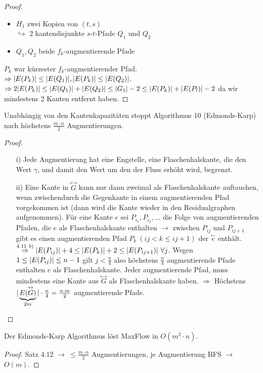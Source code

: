 \begin{proof}
	\begin{itemize}
		\item $H_1$ zwei Kopien von $(t,s)$\\
		$\hookrightarrow$ 2 kantendisjunkte $s$-$t$-Pfade $Q_1$ und $Q_2$
		\item $Q_1, Q_2$ beide $f_k$-augmentierende Pfade
	\end{itemize}
	$P_k$ war kürzester $f_k$-augmentierender Pfad.\\
	$\Rightarrow \vert E(P_k) \vert \le \vert E(Q_1) \vert, \vert E(P_k) \vert \le \vert E(Q_2) \vert$.\\
	$\Rightarrow 2\vert E(P_k) \vert \le \vert E(Q_1) \vert + \vert E(Q_2) \vert \le \vert G_1 \vert -2 \le \vert E(P_k) \vert + \vert E(P_l) \vert - 2$ da wir mindestens 2 Kanten entfernt haben.
\end{proof}
\begin{satz}
	Unabhängig von den Kantenkapazitäten stoppt Algorithmus 10 (Edmonds-Karp) nach höchstens $\frac{m\cdot n}{2}$ Augmentierungen.
\end{satz}
\begin{proof}~
	\begin{itemize}
		\item[i)] Jede Augmentierung hat eine \dq Engstelle\dq, eine \dq Flaschenhalskante\dq, die den Wert $\gamma$, und damit den Wert um den der Fluss erhöht wird, begrenzt.
		\item[ii)] Eine Kante in $\overset{\leftrightarrow}{G}$ kann nur dann zweimal als Flaschenhalskante auftauchen, wenn zwischendurch die Gegenkante in einem augmentierenden Pfad vorgekommen ist (dann wird die Kante wieder in den Residualgraphen aufgenommen). Für eine Kante $e$ sei $P_{i_1}, P_{i_2}, ...$ die Folge von augmentierenden Pfaden, die $e$ als Flaschenhalskante enthalten $\to$ zwischen $P_{ij}$ und $P_{ij+1}$ gibt es einen augmentierenden Pfad $P_k ~(ij < k \le ij+1)$ der $\overset{\leftarrow}{e}$ enthält. $\overset{4.11~b)}{\Rightarrow} \vert E(P_{ij}) \vert + 4 \le \vert E(P_k) \vert + 2 \le \vert E(P_{ij+1}) \vert ~\forall j$. Wegen $1 \le \vert E(P_{ij}) \vert \le n-1$ gilt $j < \frac{n}{4}$ also höchstens $\frac{n}{4}$ augmentierende Pfade enthalten $e$ als Flaschenhalskante. Jeder augmentierende Pfad, muss mindestens eine Kante aus $\overset{\leftrightarrow}{G}$ als Flaschenhalskante haben. $\Rightarrow$ Höchstens $\vert \underbrace{E(\overset{\leftrightarrow}{G})}_{2m} \vert\cdot \frac{n}{4} = \frac{n \cdot m}{2}$ augmentierende Pfade.
	\end{itemize}
\end{proof}
\begin{korollar}
	Der Edmonds-Karp Algorithmus löst MaxFlow in $O(m^2\cdot n)$.
\end{korollar}
\begin{proof}
	Satz 4.12 $\to ~\le\frac{m\cdot n}{2}$ Augmentierungen, je Augmentierung BFS $\to$ $O(m)$.
\end{proof}